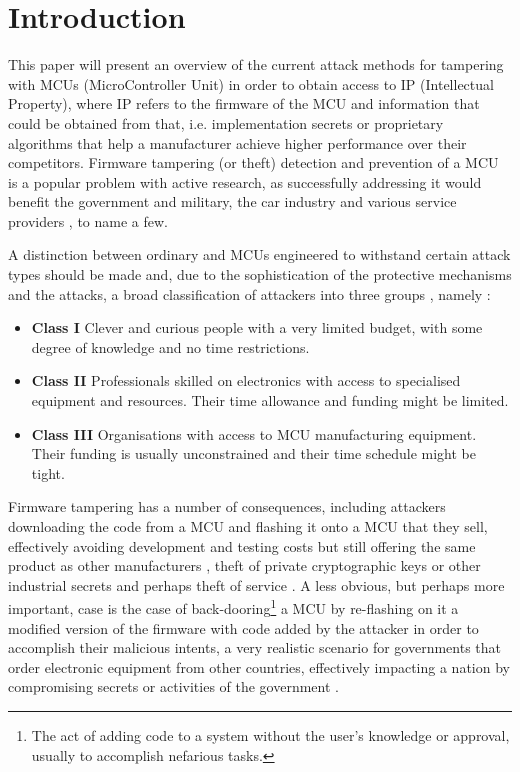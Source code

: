 \section{Introduction}
	This paper will present an overview of the current attack methods for tampering with MCUs (MicroController Unit) in order to obtain access to IP (Intellectual Property), where IP refers to the firmware of the MCU and information that could be obtained from that, i.e. implementation secrets or proprietary algorithms that help a manufacturer achieve higher performance over their competitors. Firmware tampering (or theft) detection and prevention of a MCU is a popular problem with active research, as successfully addressing it would benefit the government and military, the car industry and various service providers \citep{sergei:thesis}, to name a few.
	
	A distinction between ordinary and MCUs engineered to withstand certain attack types should be made\citep{sergei:thesis} and, due to the sophistication of the protective mechanisms and the attacks, a broad classification of attackers into three groups \cite{anderson:cautionary_note}, namely :
		\begin{itemize}
			\item \textbf{Class I} Clever and curious people with a very limited budget, with some degree of knowledge and no time restrictions.\\
			\item \textbf{Class II} Professionals skilled on electronics with access to specialised equipment and resources. Their time allowance and funding might be limited.\\
			\item \textbf{Class III} Organisations with access to MCU manufacturing equipment. Their funding is usually unconstrained and their time schedule might be tight.
		\end{itemize}
	
	Firmware tampering has a number of consequences, including attackers downloading the code from a MCU and flashing it onto a MCU that they sell, effectively avoiding development and testing costs but still offering the same product as other manufacturers \cite{tech:aes_bls}, theft of private cryptographic keys or other industrial secrets and perhaps theft of service \citep{sergei:thesis}. A less obvious, but perhaps more important, case is the case of back-dooring\footnote{The act of adding code to a system without the user's knowledge or approval, usually to accomplish nefarious tasks.} a MCU by re-flashing on it a modified version of the firmware with code added by the attacker in order to accomplish their malicious intents, a very realistic scenario for governments that order electronic equipment from other countries, effectively impacting a nation by compromising secrets or activities of the government .

